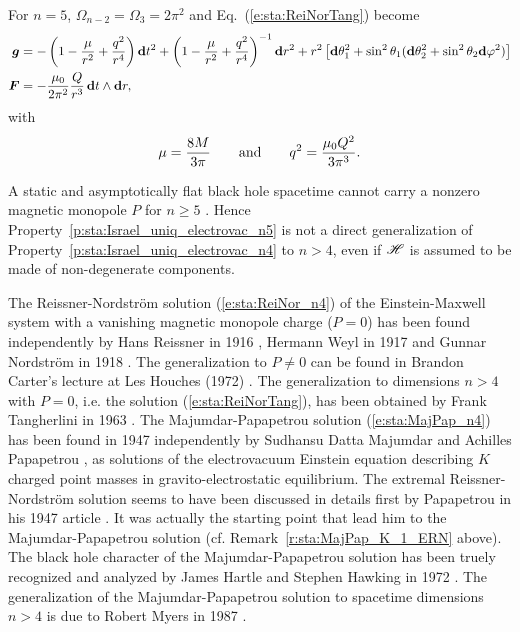 \begin{example}
For $n=5$, $\Omega_{n-2} = \Omega_3 = 2\pi^2$ and Eq.~(\ref{e:sta:ReiNorTang}) become
\begin{align}
    \bm{g} & =  - \left( 1 - \frac{\mu}{r^2} + \frac{q^2}{r^{4}} \right)  \mathbf{d} t^2
    +  \left( 1 - \frac{\mu}{r^{2}} + \frac{q^2}{r^{4}}  \right) ^{-1} \mathbf{d} r^2
    + r^2 \left[ \mathbf{d}\theta_1^2 + \sin^2\theta_1( \mathbf{d}\theta_2^2 + \sin^2\theta_2 \mathbf{d}\varphi^2 ) \right]
        \nonumber \\
    \bm{F} & = - \frac{\mu_0}{2\pi^2} \frac{Q}{r^3} \,  \mathbf{d} t \wedge \mathbf{d} r , \nonumber
\end{align}
with
\[
    \mu = \frac{8 M}{3\pi}
    \qquad\mbox{and}\qquad
    q^2 = \frac{\mu_0 Q^2}{3\pi^3} .
\]
\end{example}


\begin{remark}
A static and asymptotically flat black hole spacetime cannot carry a nonzero magnetic monopole $P$
for $n \geq 5$ \cite{EmparOS10}. Hence Property~\ref{p:sta:Israel_uniq_electrovac_n5}
is not a direct generalization of Property~\ref{p:sta:Israel_uniq_electrovac_n4} to $n > 4$,
even if $\mathscr{H}$ is assumed to be made of non-degenerate components.
\end{remark}

\begin{hist}
The Reissner-Nordström solution (\ref{e:sta:ReiNor_n4})
of the Einstein-Maxwell system with a vanishing magnetic monopole charge ($P=0$) has been found independently by Hans Reissner
in 1916 \cite{Reiss1916}, Hermann Weyl in 1917 \cite{Weyl1917}
and Gunnar Nordström in 1918 \cite{Nords1918}.
The generalization to $P\neq 0$ can be found in Brandon Carter's
lecture at Les Houches (1972) \cite{Carte73a}.
The generalization to dimensions $n > 4$ with $P=0$, i.e. the solution (\ref{e:sta:ReiNorTang}),
has been obtained by Frank Tangherlini in 1963 \cite{Tangh63}.
The Majumdar-Papapetrou solution (\ref{e:sta:MajPap_n4}) has been found
in 1947 independently by Sudhansu Datta Majumdar \cite{Majum47}
and Achilles Papapetrou \cite{Papap47}, as solutions of the electrovacuum
Einstein equation describing $K$ charged point masses in gravito-electrostatic equilibrium.
The extremal Reissner-Nordström solution seems to have been discussed in details first
by Papapetrou in his 1947 article \cite{Papap47}. It was actually the starting point that lead
him to the Majumdar-Papapetrou solution (cf. Remark~\ref{r:sta:MajPap_K_1_ERN} above).
The black hole character of the Majumdar-Papapetrou solution has been truely recognized
and analyzed by James Hartle and Stephen Hawking
in 1972 \cite{HartlH72}. The generalization of the Majumdar-Papapetrou solution
to spacetime dimensions $n > 4$ is due to Robert Myers in 1987
\cite{Myers87}.
\end{hist}

